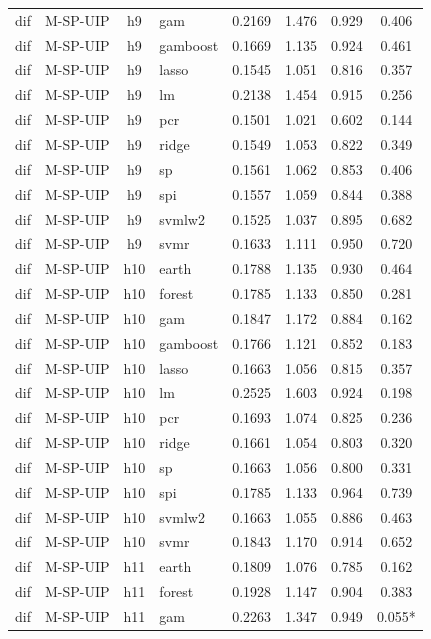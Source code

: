 \begin{ThreePartTable}
\begin{longtable}[t]{llclcccc}
dif & M-SP-UIP & h9 & gam & 0.2169 & 1.476 & 0.929 & 0.406\\
dif & M-SP-UIP & h9 & gamboost & 0.1669 & 1.135 & 0.924 & 0.461\\
dif & M-SP-UIP & h9 & lasso & 0.1545 & 1.051 & 0.816 & 0.357\\
dif & M-SP-UIP & h9 & lm & 0.2138 & 1.454 & 0.915 & 0.256\\
dif & M-SP-UIP & h9 & pcr & 0.1501 & 1.021 & 0.602 & 0.144\\
dif & M-SP-UIP & h9 & ridge & 0.1549 & 1.053 & 0.822 & 0.349\\
dif & M-SP-UIP & h9 & sp & 0.1561 & 1.062 & 0.853 & 0.406\\
dif & M-SP-UIP & h9 & spi & 0.1557 & 1.059 & 0.844 & 0.388\\
dif & M-SP-UIP & h9 & svmlw2 & 0.1525 & 1.037 & 0.895 & 0.682\\
dif & M-SP-UIP & h9 & svmr & 0.1633 & 1.111 & 0.950 & 0.720\\
\addlinespace
dif & M-SP-UIP & h10 & earth & 0.1788 & 1.135 & 0.930 & 0.464\\
dif & M-SP-UIP & h10 & forest & 0.1785 & 1.133 & 0.850 & 0.281\\
dif & M-SP-UIP & h10 & gam & 0.1847 & 1.172 & 0.884 & 0.162\\
dif & M-SP-UIP & h10 & gamboost & 0.1766 & 1.121 & 0.852 & 0.183\\
dif & M-SP-UIP & h10 & lasso & 0.1663 & 1.056 & 0.815 & 0.357\\
dif & M-SP-UIP & h10 & lm & 0.2525 & 1.603 & 0.924 & 0.198\\
dif & M-SP-UIP & h10 & pcr & 0.1693 & 1.074 & 0.825 & 0.236\\
dif & M-SP-UIP & h10 & ridge & 0.1661 & 1.054 & 0.803 & 0.320\\
dif & M-SP-UIP & h10 & sp & 0.1663 & 1.056 & 0.800 & 0.331\\
dif & M-SP-UIP & h10 & spi & 0.1785 & 1.133 & 0.964 & 0.739\\
dif & M-SP-UIP & h10 & svmlw2 & 0.1663 & 1.055 & 0.886 & 0.463\\
dif & M-SP-UIP & h10 & svmr & 0.1843 & 1.170 & 0.914 & 0.652\\
\addlinespace
dif & M-SP-UIP & h11 & earth & 0.1809 & 1.076 & 0.785 & 0.162\\
dif & M-SP-UIP & h11 & forest & 0.1928 & 1.147 & 0.904 & 0.383\\
dif & M-SP-UIP & h11 & gam & 0.2263 & 1.347 & 0.949 & 0.055*\\

\end{longtable}
\end{ThreePartTable}
